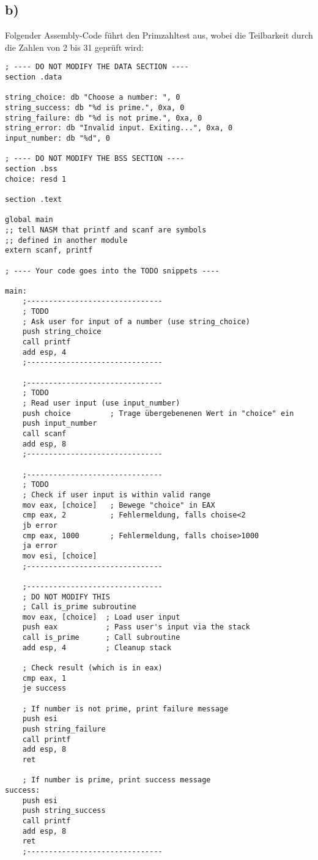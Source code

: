 \documentclass[]{scrreprt}
\begin{document}
\subsection*{b)}
Folgender Assembly-Code führt den Primzahltest aus, wobei die Teilbarkeit durch die Zahlen von 2 bis 31 geprüft wird:
\begin{lstlisting}
; ---- DO NOT MODIFY THE DATA SECTION ----
section .data

string_choice: db "Choose a number: ", 0
string_success: db "%d is prime.", 0xa, 0
string_failure: db "%d is not prime.", 0xa, 0
string_error: db "Invalid input. Exiting...", 0xa, 0
input_number: db "%d", 0

; ---- DO NOT MODIFY THE BSS SECTION ----
section .bss
choice: resd 1

section .text

global main
;; tell NASM that printf and scanf are symbols
;; defined in another module
extern scanf, printf

; ---- Your code goes into the TODO snippets ----

main:
    ;-------------------------------
    ; TODO
    ; Ask user for input of a number (use string_choice)
    push string_choice
    call printf
    add esp, 4
    ;-------------------------------
    
    ;-------------------------------
    ; TODO
    ; Read user input (use input_number)
    push choice			; Trage übergebenenen Wert in "choice" ein
    push input_number
	call scanf
	add esp, 8
    ;-------------------------------
    
    ;-------------------------------
    ; TODO
    ; Check if user input is within valid range
    mov eax, [choice]	; Bewege "choice" in EAX
	cmp eax, 2			; Fehlermeldung, falls choise<2
	jb error
	cmp eax, 1000		; Fehlermeldung, falls choise>1000
	ja error
	mov esi, [choice]
    ;-------------------------------
    
    ;-------------------------------
    ; DO NOT MODIFY THIS
    ; Call is_prime subroutine
    mov eax, [choice]  ; Load user input
    push eax           ; Pass user's input via the stack
    call is_prime      ; Call subroutine
    add esp, 4         ; Cleanup stack
    
    ; Check result (which is in eax)
    cmp eax, 1
    je success
    
    ; If number is not prime, print failure message
    push esi
    push string_failure
    call printf
    add esp, 8
    ret 
    
    ; If number is prime, print success message
success:
    push esi
    push string_success
    call printf
    add esp, 8
    ret
    ;-------------------------------
    

\end{lstlisting}
\end{document}
